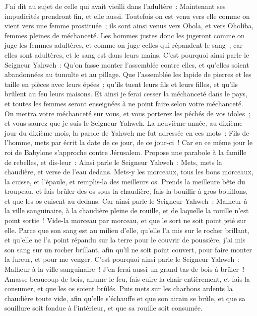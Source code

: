 \begin{multicols}{2}
J'ai dit au sujet de celle qui avait vieilli dans l'adultère~: Maintenant ses impudicités prendront fin, et elle aussi.
Toutefois on est venu vers elle comme on vient vers une femme prostituée~; ils sont ainsi venus vers Ohola, et vers Oholiba, femmes pleines de méchanceté.
Les hommes justes donc les jugeront comme on juge les femmes adultères, et comme on juge celles qui répandent le sang~; car elles sont adultères, et le sang est dans leurs mains.
C'est pourquoi ainsi parle le Seigneur Yahweh~: Qu'on fasse monter l'assemblée contre elles, et qu'elles soient abandonnées au tumulte et au pillage.
Que l'assemblée les lapide de pierres et les taille en pièces avec leurs épées~; qu'ils tuent leurs fils et leurs filles, et qu'ils brûlent au feu leurs maisons.
Et ainsi je ferai cesser la méchanceté dans le pays, et toutes les femmes seront enseignées à ne point faire selon votre méchanceté.
On mettra votre méchanceté sur vous, et vous porterez les péchés de vos idoles~; et vous saurez que je suis le Seigneur Yahweh.
\VerseOne{}La neuvième année, au dixième jour du dixième mois, la parole de Yahweh me fut adressée en ces mots~:
Fils de l'homme, mets par écrit la date de ce jour, de ce jour-ci~! Car en ce même jour le roi de Babylone s'approche contre Jérusalem.
Propose une parabole à la famille de rebelles, et dis-leur~: Ainsi parle le Seigneur Yahweh~: Mets, mets la chaudière, et verse de l'eau dedans.
Mets-y les morceaux, tous les bons morceaux, la cuisse, et l'épaule, et remplis-la des meilleurs os.
Prends la meilleure bête du troupeau, et fais brûler des os sous la chaudière, fais-la bouillir à gros bouillons, et que les os cuisent au-dedans.
Car ainsi parle le Seigneur Yahweh~: Malheur à la ville sanguinaire, à la chaudière pleine de rouille, et de laquelle la rouille n'est point sortie~! Vide-la morceau par morceau, et que le sort ne soit point jeté sur elle.
Parce que son sang est au milieu d'elle, qu'elle l'a mis sur le rocher brillant, et qu'elle ne l'a point répandu sur la terre pour le couvrir de poussière,
j'ai mis son sang sur un rocher brillant, afin qu'il ne soit point couvert, pour faire monter la fureur, et pour me venger.
C'est pourquoi ainsi parle le Seigneur Yahweh~: Malheur à la ville sanguinaire~! J'en ferai aussi un grand tas de bois à brûler~!
Amasse beaucoup de bois, allume le feu, fais cuire la chair entièrement, et fais-la consumer, et que les os soient brûlés.
Puis mets sur les charbons ardents la chaudière toute vide, afin qu'elle s'échauffe et que son airain se brûle, et que sa souillure soit fondue à l'intérieur, et que sa rouille soit consumée.

\end{multicols}
